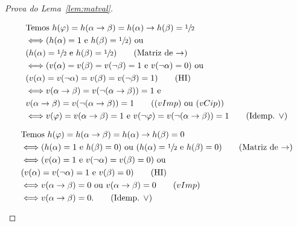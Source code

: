 \begin{proof}[Prova do Lema~\ref{lem:matval}]
\begin{provaporcasos}
\begin{provaporsubcasos}
                    \begin{align*}
                        &\textnormal{Temos }h(\phi) = h(\alpha \to \beta) = h(\alpha) \to h(\beta) = \meio{}\\
                        &\Longleftrightarrow (h(\alpha) = 1\textnormal{ e }h(\beta) = \meio{})\textnormal{ ou }\\&(h(\alpha) = \meio{}\textnormal{ e }h(\beta) = \meio{})\tag*{(Matriz de $\to$)}\\
                        &\Longleftrightarrow (v(\alpha) = v(\beta) = v(\neg \beta) = 1\textnormal{ e }v(\neg \alpha) = 0)\textnormal{ ou }\\&(v(\alpha) = v(\neg \alpha) = v(\beta) = v(\neg \beta) = 1)\tag*{(HI)}\\
                        &\Longleftrightarrow v(\alpha \to \beta) = v(\neg (\alpha \to \beta)) = 1\textnormal{ e }\\&v(\alpha \to \beta) = v(\neg (\alpha \to \beta)) = 1\tag*{($(vImp)$\textnormal{ ou }$(vCip)$)}\\
                        &\Longleftrightarrow v(\phi) = v(\alpha \to \beta) = 1\textnormal{ e }v(\neg \phi) = v(\neg (\alpha \to \beta)) = 1\tag*{(Idemp. $\lor$)}
                    \end{align*}
                        
                    \begin{align*}
                        &\textnormal{Temos }h(\varphi) = h(\alpha \to \beta) = h(\alpha) \to h(\beta) = 0\\
                        &\Longleftrightarrow (h(\alpha) = 1\textnormal{ e }h(\beta) = 0)\textnormal{ ou }(h(\alpha) = \sfrac{1}{2}{}\textnormal{ e }h(\beta) = 0)\tag*{(Matriz de $\to$)}\\
                        &\Longleftrightarrow (v(\alpha) = 1\textnormal{ e }v(\neg \alpha) = v(\beta) = 0)\textnormal{ ou }\\&(v(\alpha) = v(\neg \alpha) = 1\textnormal{ e }v(\beta) = 0)\tag*{(HI)}\\
                        &\Longleftrightarrow v(\alpha \to \beta) = 0\textnormal{ ou }v(\alpha \to \beta) = 0\tag*{$(vImp)$}\\
                        &\Longleftrightarrow v(\alpha \to \beta) = 0.\tag*{(Idemp. $\lor$)}
                    \end{align*}
            \end{provaporsubcasos}
        \end{provaporcasos}
    \end{proof}

